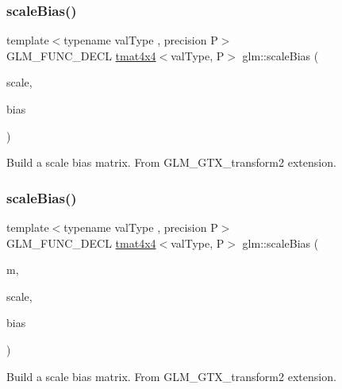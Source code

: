 \subsubsection{\texorpdfstring{scale\+Bias()}{scaleBias()}\hspace{0.1cm}{\footnotesize\ttfamily [1/2]}}
{\footnotesize\ttfamily template$<$typename val\+Type , precision P$>$ \\
G\+L\+M\+\_\+\+F\+U\+N\+C\+\_\+\+D\+E\+CL \hyperlink{structglm_1_1tmat4x4}{tmat4x4}$<$val\+Type, P$>$ glm\+::scale\+Bias (\begin{DoxyParamCaption}\item[{val\+Type}]{scale,  }\item[{val\+Type}]{bias }\end{DoxyParamCaption})}

Build a scale bias matrix. From G\+L\+M\+\_\+\+G\+T\+X\+\_\+transform2 extension. \mbox{\label{group__gtx__transform2_gac1a1139e2980021422d1fc1c42dc74f2}} 
\subsubsection{\texorpdfstring{scale\+Bias()}{scaleBias()}\hspace{0.1cm}{\footnotesize\ttfamily [2/2]}}
{\footnotesize\ttfamily template$<$typename val\+Type , precision P$>$ \\
G\+L\+M\+\_\+\+F\+U\+N\+C\+\_\+\+D\+E\+CL \hyperlink{structglm_1_1tmat4x4}{tmat4x4}$<$val\+Type, P$>$ glm\+::scale\+Bias (\begin{DoxyParamCaption}\item[{\hyperlink{structglm_1_1tmat4x4}{tmat4x4}$<$ val\+Type, P $>$ const \&}]{m,  }\item[{val\+Type}]{scale,  }\item[{val\+Type}]{bias }\end{DoxyParamCaption})}

Build a scale bias matrix. From G\+L\+M\+\_\+\+G\+T\+X\+\_\+transform2 extension. \mbox{\label{group__gtx__transform2_ga10f6c62d8f827c4cacedb71fd05e4ba2}} 
